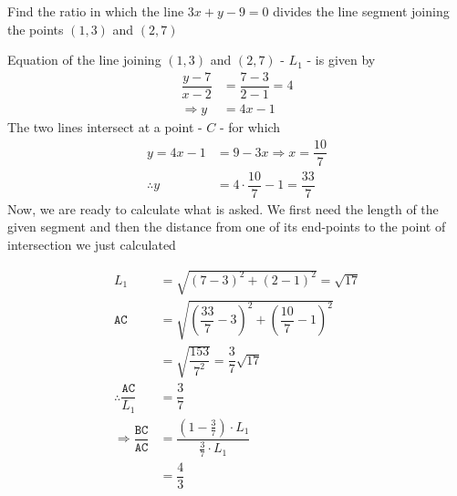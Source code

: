 

\question[5]   Find the ratio in which the line $3x+y-9=0$ divides the line segment
joining the points $(1,3)$ and $(2,7)$


\ifprintanswers
\fi 

\begin{solution}[\fullpage]
	Equation of the line joining $(1,3)$ and $(2,7)$ - $L_1$ - is given by 
	\begin{align}
		\dfrac{y-7}{x-2} &= \dfrac{7-3}{2-1} = 4 \\
		\Rightarrow y &= 4x - 1
	\end{align}
	The two lines intersect at a point - $C$ - for which
	\begin{align}
		y = 4x - 1 &= 9-3x \Rightarrow x = \dfrac{10}{7} \\
		\therefore y &= 4\cdot\dfrac{10}{7}-1 = \dfrac{33}{7}
	\end{align}
	Now, we are ready to calculate what is asked. We first need the length
	of the given segment and then the distance from one of its end-points to
	the point of intersection we just calculated 
	
	\begin{align}
		\texttt{$L_1$} &= \sqrt{(7-3)^2+(2-1)^2} = \sqrt{17} \\
		\texttt{AC} &= \sqrt{(\dfrac{33}{7}-3)^2+(\dfrac{10}{7}-1)^2} \\
		&= \sqrt{\dfrac{153}{7^2}} = \dfrac{3}{7}\sqrt{17} \\
		\therefore\dfrac{\texttt{AC}}{L_1} &= \dfrac{3}{7} \\
		\Rightarrow\dfrac{\texttt{BC}}{\texttt{AC}} &= \dfrac{(1-\frac{3}{7})\cdot L_1}{\frac{3}{7}\cdot L_1}\\
		&= \dfrac{4}{3}
	\end{align}
	
\end{solution}
